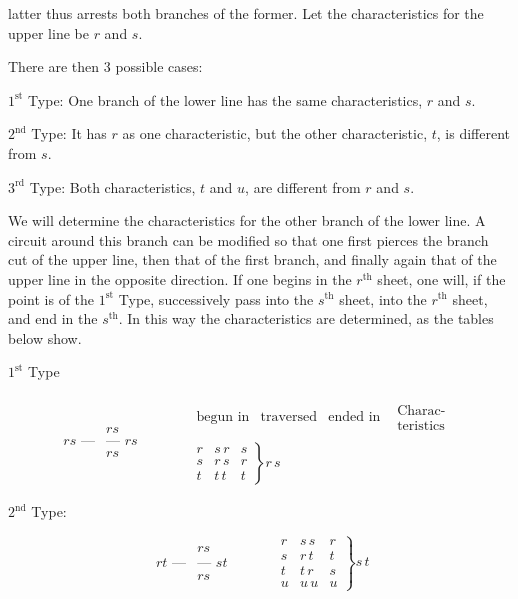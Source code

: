 \documentclass{article}
\begin{document}
latter thus arrests both branches of the former. Let the characteristics for the upper line be $r$ and $s$.

There are then 3 possible cases:

$1^{\text{st}}$ Type: One branch of the lower line has the same characteristics, $r$ and $s$.

$2^{\text{nd}}$ Type: It has $r$ as one characteristic, but the other characteristic, $t$, is different from $s$.

$3^{\text{rd}}$ Type: Both characteristics, $t$ and $u$, are different from $r$ and $s$.

We will determine the characteristics for the other branch of the lower line. A circuit around this branch can be modified so that one first pierces the branch cut of the upper line, then that of the first branch, and finally again that of the upper line in the opposite direction. If one begins in the $r^{\text{th}}$ sheet, one will, if the point is of the $1^{\text{st}}$ Type, successively pass into the $s^{\text{th}}$ sheet, into the $r^{\text{th}}$ sheet, and end in the $s^{\text{th}}$. In this way the characteristics are determined, as the tables below show.

\begin{center}
$1^{\text{st}}$ Type
\end{center}
\[
\begin{array}{c|c}
& rs \\
rs\text{ ---} & \text{--- } rs \\
& rs
\end{array}
\qquad\quad
\begin{array}{c}
\begin{array}{cccc}
\text{begun in} & \text{traversed} & \text{ended in} & \begin{array}{c}\text{Charac-}\\\text{teristics}\end{array}
\end{array} \\
\left.
\begin{array}{ccc}
r & s\,r & s \\
s & r\,s & r \\
t & t\,t & t
\end{array}
\right\} r\,s
\end{array}
\]

\begin{center}
$2^{\text{nd}}$ Type:
\end{center}
\[
\begin{array}{c|c}
& rs \\
rt\text{ ---} & \text{--- } st \\
& rs
\end{array}
\qquad\quad
\left.
\begin{array}{ccc}
r & s\,s & r \\
s & r\,t & t \\
t & t\,r & s \\
u & u\,u & u
\end{array}
\right\} s\,t
\]
\end{document}
